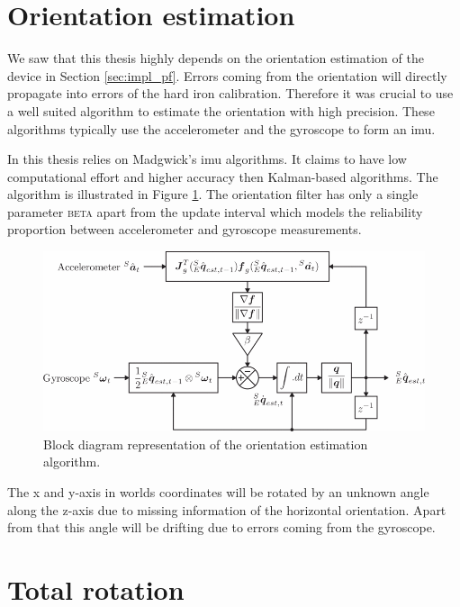 \section{Orientation estimation}
\label{sec:ori_est}

We saw that this thesis highly depends on the orientation estimation of the device in Section \ref{sec:impl_pf}. Errors coming from the orientation will directly propagate into errors of the hard iron calibration. Therefore it was crucial to use a well suited algorithm to estimate the orientation with high precision. These algorithms typically use the accelerometer and the gyroscope to form an \gls{imu}.

In this thesis relies on Madgwick's \gls{imu} algorithms.\cite{madgwick} It claims to have low computational effort and higher accuracy then Kalman-based algorithms. The algorithm is illustrated in Figure \ref{fig:madgwick_imu}. The orientation filter has only a single parameter \textsc{beta} apart from the update interval which models the reliability proportion between accelerometer and gyroscope measurements.

\begin{figure}[hbt!]
    \centering
    \includegraphics[width=1.0\textwidth]{figures/madgwick_imu.png}
    \caption{Block diagram representation of the orientation estimation algorithm.\cite{madgwick}}
    \label{fig:madgwick_imu}
\end{figure}

The x and y-axis in worlds coordinates will be rotated by an unknown angle along the z-axis due to missing information of the horizontal orientation. Apart from that this angle will be drifting due to errors coming from the gyroscope.

\section{Total rotation}

